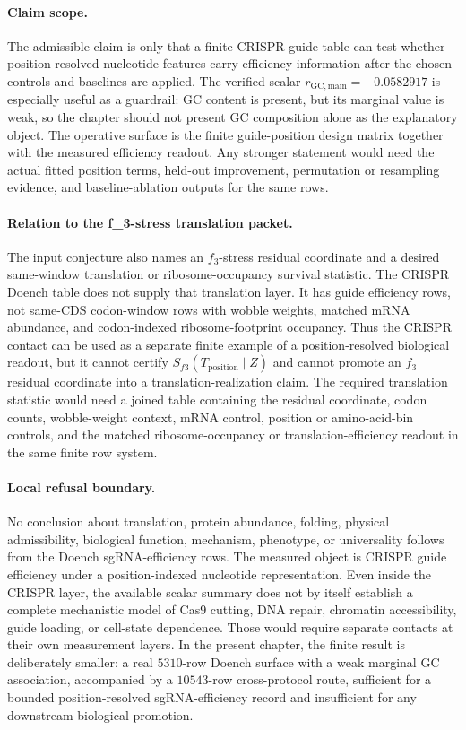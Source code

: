 \paragraph{Claim scope.}
The admissible claim is only that a finite CRISPR guide table can test whether position-resolved nucleotide features carry efficiency information after the chosen controls and baselines are applied.  The verified scalar $r_{\mathrm{GC},\mathrm{main}}=-0.0582917$ is especially useful as a guardrail: GC content is present, but its marginal value is weak, so the chapter should not present GC composition alone as the explanatory object.  The operative surface is the finite guide-position design matrix together with the measured efficiency readout.  Any stronger statement would need the actual fitted position terms, held-out improvement, permutation or resampling evidence, and baseline-ablation outputs for the same rows.

\paragraph{Relation to the f\_3-stress translation packet.}
The input conjecture also names an $f_3$-stress residual coordinate and a desired same-window translation or ribosome-occupancy survival statistic.  The CRISPR Doench table does not supply that translation layer.  It has guide efficiency rows, not same-CDS codon-window rows with wobble weights, matched mRNA abundance, and codon-indexed ribosome-footprint occupancy.  Thus the CRISPR contact can be used as a separate finite example of a position-resolved biological readout, but it cannot certify $S_{f3}(T_{\mathrm{position}}\mid Z)$ and cannot promote an $f_3$ residual coordinate into a translation-realization claim.  The required translation statistic would need a joined table containing the residual coordinate, codon counts, wobble-weight context, mRNA control, position or amino-acid-bin controls, and the matched ribosome-occupancy or translation-efficiency readout in the same finite row system.

\paragraph{Local refusal boundary.}
No conclusion about translation, protein abundance, folding, physical admissibility, biological function, mechanism, phenotype, or universality follows from the Doench sgRNA-efficiency rows.  The measured object is CRISPR guide efficiency under a position-indexed nucleotide representation.  Even inside the CRISPR layer, the available scalar summary does not by itself establish a complete mechanistic model of Cas9 cutting, DNA repair, chromatin accessibility, guide loading, or cell-state dependence.  Those would require separate contacts at their own measurement layers.  In the present chapter, the finite result is deliberately smaller: a real $5310$-row Doench surface with a weak marginal GC association, accompanied by a $10543$-row cross-protocol route, sufficient for a bounded position-resolved sgRNA-efficiency record and insufficient for any downstream biological promotion.